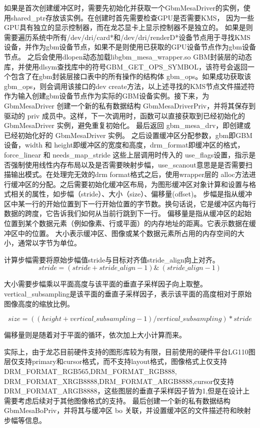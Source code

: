 如果是首次创建缓冲区时，需要先初始化并获取一个GbmMesaDriver的实例，使用shared\_ptr存放该实例。在创建时首先需要检查GPU是否需要KMS，
因为一些GPU具有独立的显示控制器，而在龙芯显卡上显示控制器不是独立的。
如果是则需要遍历系统中所有/dev/dri/card*和/dev/dri/renderD*设备节点用于寻找KMS设备，并作为gbm设备节点，如果不是则使用已获取的GPU设备节点作为gbm设备节点。
之后会使用dlopen动态加载libgbm\_mesa\_wrapper.so GBM封装层的动态库，并使用dlsym查找库中的符号GBM\_GET\_OPS\_SYMBOL，该符号会返回一个包含了在gbm封装层接口表中的所有操作的结构体
gbm\_ops。如果成功获取该gbm\_ops，则会调用该接口的dev create方法，以上述寻找的KMS节点文件描述符作为输入创建gbm设备节点作为实际的GBM设备实例。接下来，为 GbmMesaDriver 
创建一个新的私有数据结构 GbmMesaDriverPriv，并将其保存到驱动的 priv 成员中。这样，下一次调用时，函数可以直接获取到已经初始化的 GbmMesaDriver 实例，避免重复初始化。
最后返回 gbm\_mesa\_drv，即创建或已经初始化好的 GbmMesaDriver 实例。
之后设置缓冲区分配参数，gbm即GBM设备，width 和 height即缓冲区的宽度和高度，drm\_format即缓冲区的格式，force\_linear 和 needs\_map\_stride
这些上层调用时传入的 use\_flags设置，指示是否强制使用线性内存布局以及是否需要映射步幅，use\_scanout意思是是否需要扫描输出模式。在处理完无效的drm format格式之后，使用wrapper层的
alloc方法进行缓冲区的分配。之后需要初始化缓冲区布局，为图形缓冲区对象计算和设置与格式相关的属性，如步幅（stride）、大小（size）、偏移量(offset)。
步幅是指从缓冲区中某一行的开始位置到下一行开始位置的字节数。换句话说，它是缓冲区内每行数据的跨度，它告诉我们如何从当前行跳到下一行。
偏移量是指从缓冲区的起始位置到某个数据元素（例如像素、行或平面）的内存地址的距离。它表示数据在缓冲区中的位置。
大小表示缓冲区、图像或某个数据元素所占用的内存空间的大小，通常以字节为单位。

计算步幅需要将原始步幅值stride与目标对齐值stride\_align向上对齐。
\begin{equation}
  stride=(stride+stride\_align-1)\&~(stride\_align-1)
\end{equation}

大小需要步幅乘以平面高度与该平面的垂直子采样因子向上取整。vertical\_subsampling是该平面的垂直子采样因子，表示该平面的高度相对于原始图像高度的缩放比例。

\begin{equation}
  size=((height+vertical\_subsampling-1)/vertical\_subsampling)*stride
\end{equation}

偏移量则是随着对于平面的循环，依次加上大小计算而来。

实际上，由于龙芯目前硬件支持的图形库较为有限，目前使用的硬件平台LG110图层仅支持primary和cursor格式，而不支持layout格式，图像格式上仅支持DRM\_FORMAT\_RGB565,DRM\_FORMAT\_RGB888,
DRM\_FORMAT\_XRGB8888,DRM\_FORMAT\_ARGB8888,cursor仅支持DRM\_FORMAT\_ARGB8888，这些图层的垂直子采样因子皆为1,但是在设计上需要考虑后续对于其他图像格式的支持。
最后创建一个新的私有数据结构 GbmMesaBoPriv，并将其与缓冲区 bo 关联，并设置缓冲区的文件描述符和映射步幅等信息。

